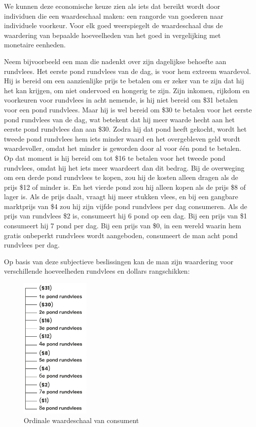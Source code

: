 We kunnen deze economische keuze zien als iets dat bereikt wordt door individuen die een waardeschaal maken: een rangorde van goederen naar individuele voorkeur. Voor elk goed weerspiegelt de waardeschaal dus de waardering van bepaalde hoeveelheden van het goed in vergelijking met monetaire eenheden.

Neem bijvoorbeeld een man die nadenkt over zijn dagelijkse behoefte aan rundvlees. Het eerste pond rundvlees van de dag, is voor hem extreem waardevol. Hij is bereid om een aanzienlijke prijs te betalen om er zeker van te zijn dat hij het kan krijgen, om niet ondervoed en hongerig te zijn. Zijn inkomen, rijkdom en voorkeuren voor rundvlees in acht nemende, is hij niet bereid om \$31 betalen voor een pond rundvlees. Maar hij is wel bereid om \$30 te betalen voor het eerste pond rundvlees van de dag, wat betekent dat hij meer waarde hecht aan het eerste pond rundvlees dan aan \$30. Zodra hij dat pond heeft gekocht, wordt het tweede pond rundvlees hem iets minder waard en het overgebleven geld wordt waardevoller, omdat het minder is geworden door al voor één pond te betalen. Op dat moment is hij bereid om tot \$16 te betalen voor het tweede pond rundvlees, omdat hij het iets meer waardeert dan dit bedrag. Bij de overweging om een derde pond rundvlees te kopen, zou hij de kosten alleen dragen als de prijs \$12 of minder is. En het vierde pond zou hij alleen kopen als de prijs \$8 of lager is. Als de prijs daalt, vraagt hij meer stukken vlees, en bij een gangbare marktprijs van \$4 zou hij zijn vijfde pond rundvlees per dag consumeren. Als de prijs van rundvlees \$2 is, consumeert hij 6 pond op een dag. Bij een prijs van \$1 consumeert hij 7 pond per dag. Bij een prijs van \$0, in een wereld waarin hem gratis onbeperkt rundvlees wordt aangeboden, consumeert de man acht pond rundvlees per dag.

Op basis van deze subjectieve beslissingen kan de man zijn waardering voor verschillende hoeveelheden rundvlees en dollars rangschikken:

\begin{figure}[H]
\centering
    \includegraphics[height=7cm]{figures/fig20.pdf}
    \caption[Ordinale waardeschaal van consument]{Ordinale waardeschaal van consument}
    \label{fig20}
\end{figure}

